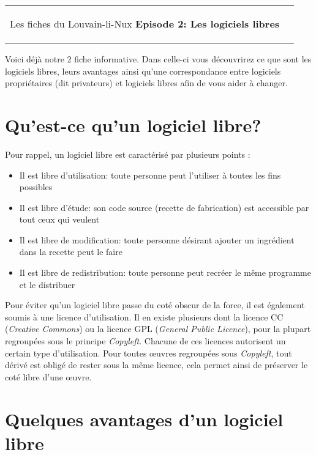 



\begin{tabular}{p{14cm}r}
	\begin{center}{\Large Les fiches du Louvain-li-Nux\linebreak \linebreak
	\LARGE \textbf{Episode 2: Les logiciels libres}}\end{center}
		&
	\usebox{\logollnux}
\end{tabular}

\vspace*{0.5cm}
Voici déjà notre 2 fiche informative. Dans celle-ci vous découvrirez ce que sont les logiciels libres, leurs avantages ainsi qu'une correspondance entre logiciels propriétaires (dit privateurs) et logiciels libres afin de vous aider à changer.

\section*{Qu'est-ce qu'un logiciel libre?}

Pour rappel, un logiciel libre est caractérisé par plusieurs points : 
\begin{itemize}
\item Il est libre d'utilisation: toute personne peut l'utiliser à toutes les fins possibles
\item Il est libre d'étude: son code source (recette de fabrication) est accessible par tout ceux qui veulent
\item Il est libre de modification: toute personne désirant ajouter un ingrédient dans la recette peut le faire
\item Il est libre de redistribution: toute personne peut recréer le même programme et le distribuer
\end{itemize}

Pour éviter qu'un logiciel libre passe du coté obscur de la force, il est également soumis à une licence d'utilisation. Il en existe plusieurs dont la licence CC (\textit{Creative Commons}) ou la licence GPL (\textit{General Public Licence}), pour la plupart regroupées sous le principe \textit{Copyleft}. Chacune de ces licences autorisent un certain type d'utilisation. Pour toutes œuvres regroupées sous \textit{Copyleft}, tout dérivé est obligé de rester sous la même licence, cela permet ainsi de préserver le coté libre d'une œuvre.

\section*{Quelques avantages d'un logiciel libre}

